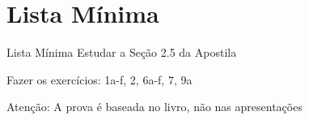 \section{Lista Mínima}

\begin{frame}{Lista Mínima}
  Estudar a Seção 2.5 da Apostila

  Fazer os exercícios: 1a-f, 2, 6a-f, 7, 9a

  \vfill
  Atenção: A prova é baseada no livro, não nas apresentações
\end{frame}


